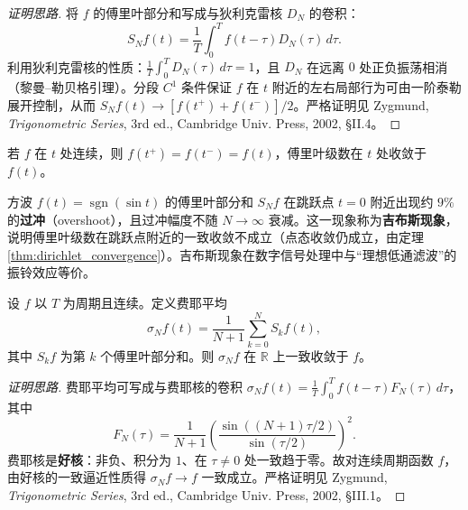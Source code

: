\begin{proof}[证明思路]
将 $f$ 的傅里叶部分和写成与狄利克雷核 $D_N$ 的卷积：
\[
S_N f(t) = \frac{1}{T}\int_0^T f(t - \tau) D_N(\tau)\,d\tau.
\]
利用狄利克雷核的性质：$\frac{1}{T}\int_0^T D_N(\tau)\,d\tau = 1$，且 $D_N$ 在远离 $0$ 处正负振荡相消（黎曼–勒贝格引理）。分段 $C^1$ 条件保证 $f$ 在 $t$ 附近的左右局部行为可由一阶泰勒展开控制，从而 $S_N f(t) \to [f(t^+) + f(t^-)]/2$。严格证明见 Zygmund, \textit{Trigonometric Series}, 3rd ed., Cambridge Univ. Press, 2002, \S{}II.4。
\end{proof}

\begin{corollary}[连续点处的点态收敛]\label{cor:fourier_continuity}
若 $f$ 在 $t$ 处连续，则 $f(t^+) = f(t^-) = f(t)$，傅里叶级数在 $t$ 处收敛于 $f(t)$。
\end{corollary}

\begin{example}[吉布斯现象]\label{ex:gibbs_phenomenon}
方波 $f(t) = \operatorname{sgn}(\sin t)$ 的傅里叶部分和 $S_N f$ 在跳跃点 $t = 0$ 附近出现约 $9\%$ 的\textbf{过冲}（overshoot），且过冲幅度不随 $N \to \infty$ 衰减。这一现象称为\textbf{吉布斯现象}，说明傅里叶级数在跳跃点附近的一致收敛不成立（点态收敛仍成立，由定理 \ref{thm:dirichlet_convergence}）。吉布斯现象在数字信号处理中与“理想低通滤波”的振铃效应等价。
\end{example}

\begin{theorem}[费耶核与一致收敛]\label{thm:fejer_uniform}
设 $f$ 以 $T$ 为周期且连续。定义费耶平均
\[
\sigma_N f(t) = \frac{1}{N+1}\sum_{k=0}^{N} S_k f(t),
\]
其中 $S_k f$ 为第 $k$ 个傅里叶部分和。则 $\sigma_N f$ 在 $\mathbb{R}$ 上一致收敛于 $f$。
\end{theorem}

\begin{proof}[证明思路]
费耶平均可写成与费耶核的卷积 $\sigma_N f(t) = \frac{1}{T}\int_0^T f(t-\tau) F_N(\tau)\,d\tau$，其中
\[
F_N(\tau) = \frac{1}{N+1}\left(\frac{\sin((N+1)\tau/2)}{\sin(\tau/2)}\right)^2.
\]
费耶核是\textbf{好核}：非负、积分为 $1$、在 $\tau \neq 0$ 处一致趋于零。故对连续周期函数 $f$，由好核的一致逼近性质得 $\sigma_N f \to f$ 一致成立。严格证明见 Zygmund, \textit{Trigonometric Series}, 3rd ed., Cambridge Univ. Press, 2002, \S{}III.1。
\end{proof}

